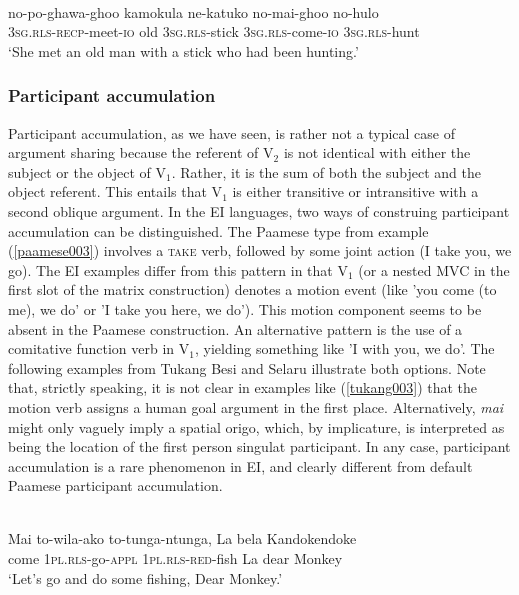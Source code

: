 \ea \label{}
\\
\gll no-po-ghawa-ghoo kamokula ne-katuko no-mai-ghoo no-hulo \\
3\textsc{sg}.\textsc{rls}-\textsc{recp}-meet-\textsc{io} old 3\textsc{sg}.\textsc{rls}-stick 3\textsc{sg}.\textsc{rls}-come-\textsc{io} 3\textsc{sg}.\textsc{rls}-hunt \\
\glft `She met an old man with a stick who had been hunting.'\\ 
\z

\subsubsection{Participant accumulation}

Participant accumulation, as we have seen, is rather not a typical case of argument sharing because the referent of V$_2$ is not identical with either the subject or the object of V$_1$. Rather, it is the sum of both the subject and the object referent. This entails that V$_1$ is either transitive or intransitive with a second oblique argument. In the EI languages, two ways of construing participant accumulation can be distinguished. The Paamese type from example (\ref{paamese003}) involves a \textsc{take} verb, followed by some joint action (I take you, we go). The EI examples differ from this pattern in that V$_1$ (or a nested MVC in the first slot of the matrix construction) denotes a motion event (like 'you come (to me), we do' or 'I take you here, we do'). This motion component seems to be absent in the Paamese construction. An alternative pattern is the use of a comitative function verb in V$_1$, yielding something like 'I with you, we do'. The following examples from Tukang Besi and Selaru illustrate both options. Note that, strictly speaking, it is not clear in examples like (\ref{tukang003}) that the motion verb assigns a human goal argument in the first place. Alternatively, \textit{mai} might only vaguely imply a spatial origo, which, by implicature, is interpreted as being the location of the first person singulat participant. In any case, participant accumulation is a rare phenomenon in EI, and clearly different from default Paamese participant accumulation.

\ea \label{tukang003}
\\
\gll Mai to-wila-ako to-tunga-ntunga, La bela Kandokendoke \\
come 1\textsc{pl}.\textsc{rls}-go-\textsc{appl} 1\textsc{pl}.\textsc{rls}-\textsc{red}-fish La dear Monkey \\
\glft `Let's go and do some fishing, Dear Monkey.'\\ 
\z

